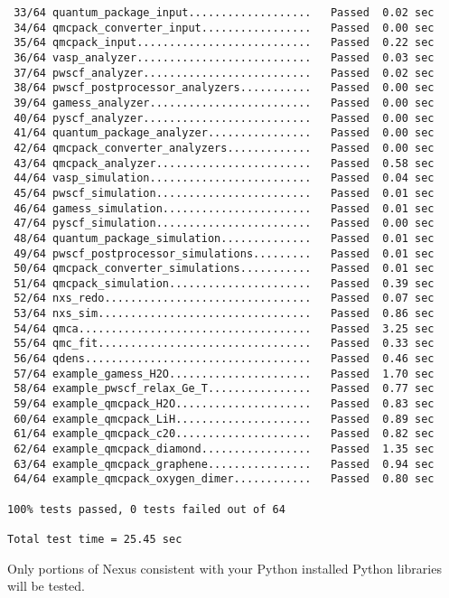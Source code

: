 \documentclass[oneside,11pt]{memoir}
\numberwithin{equation}{section}
\begin{document}
\begin{shaded}
\begin{verbatim}
 33/64 quantum_package_input...................   Passed  0.02 sec
 34/64 qmcpack_converter_input.................   Passed  0.00 sec
 35/64 qmcpack_input...........................   Passed  0.22 sec
 36/64 vasp_analyzer...........................   Passed  0.03 sec
 37/64 pwscf_analyzer..........................   Passed  0.02 sec
 38/64 pwscf_postprocessor_analyzers...........   Passed  0.00 sec
 39/64 gamess_analyzer.........................   Passed  0.00 sec
 40/64 pyscf_analyzer..........................   Passed  0.00 sec
 41/64 quantum_package_analyzer................   Passed  0.00 sec
 42/64 qmcpack_converter_analyzers.............   Passed  0.00 sec
 43/64 qmcpack_analyzer........................   Passed  0.58 sec
 44/64 vasp_simulation.........................   Passed  0.04 sec
 45/64 pwscf_simulation........................   Passed  0.01 sec
 46/64 gamess_simulation.......................   Passed  0.01 sec
 47/64 pyscf_simulation........................   Passed  0.00 sec
 48/64 quantum_package_simulation..............   Passed  0.01 sec
 49/64 pwscf_postprocessor_simulations.........   Passed  0.01 sec
 50/64 qmcpack_converter_simulations...........   Passed  0.01 sec
 51/64 qmcpack_simulation......................   Passed  0.39 sec
 52/64 nxs_redo................................   Passed  0.07 sec
 53/64 nxs_sim.................................   Passed  0.86 sec
 54/64 qmca....................................   Passed  3.25 sec
 55/64 qmc_fit.................................   Passed  0.33 sec
 56/64 qdens...................................   Passed  0.46 sec
 57/64 example_gamess_H2O......................   Passed  1.70 sec
 58/64 example_pwscf_relax_Ge_T................   Passed  0.77 sec
 59/64 example_qmcpack_H2O.....................   Passed  0.83 sec
 60/64 example_qmcpack_LiH.....................   Passed  0.89 sec
 61/64 example_qmcpack_c20.....................   Passed  0.82 sec
 62/64 example_qmcpack_diamond.................   Passed  1.35 sec
 63/64 example_qmcpack_graphene................   Passed  0.94 sec
 64/64 example_qmcpack_oxygen_dimer............   Passed  0.80 sec

100% tests passed, 0 tests failed out of 64

Total test time = 25.45 sec
\end{verbatim}
\end{shaded}
Only portions of Nexus consistent with your Python installed Python libraries will be tested.
\end{document}
